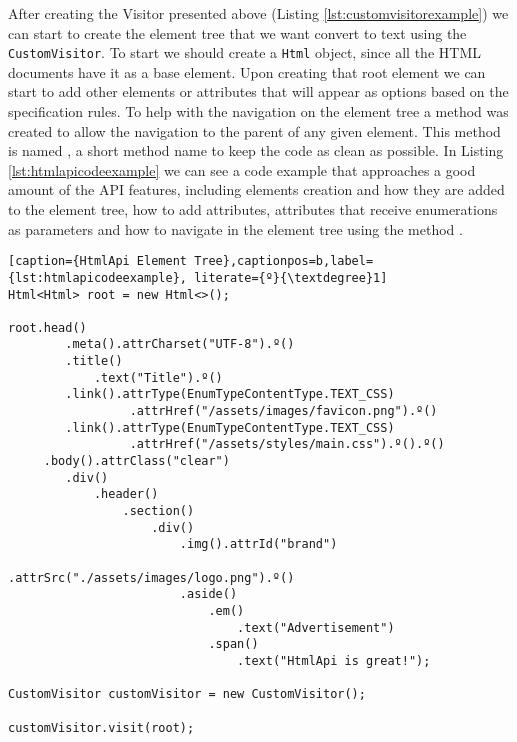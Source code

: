 \noindent
After creating the Visitor presented above (Listing \ref{lst:customvisitorexample}) we can start to create the element tree that we want convert to text using the \texttt{CustomVisitor}. To start we should create a \texttt{Html} object, since all the \ac{HTML} documents have it as a base element. Upon creating that root element we can start to add other elements or attributes that will appear as options based on the specification rules. To help with the navigation on the element tree a method was created to allow the navigation to the parent of any given element. This method is named \texttt{\textdegree}, a short method name to keep the code as clean as possible. In Listing \ref{lst:htmlapicodeexample} we can see a code example that approaches a good amount of the \ac{API} features, including elements creation and how they are added to the element tree, how to add attributes, attributes that receive enumerations as parameters and how to navigate in the element tree using the method \texttt{\textdegree}.

\bigskip


\begin{minipage}{\linewidth}
\begin{lstlisting}[caption={HtmlApi Element Tree},captionpos=b,label={lst:htmlapicodeexample}, literate={º}{\textdegree}1]
Html<Html> root = new Html<>();

root.head()
        .meta().attrCharset("UTF-8").º()
        .title()
            .text("Title").º()
        .link().attrType(EnumTypeContentType.TEXT_CSS)
                 .attrHref("/assets/images/favicon.png").º()
        .link().attrType(EnumTypeContentType.TEXT_CSS)
                 .attrHref("/assets/styles/main.css").º().º()
     .body().attrClass("clear")
        .div()
            .header()
                .section()
                    .div()
                        .img().attrId("brand")
                                .attrSrc("./assets/images/logo.png").º()
                        .aside()
                            .em()
                                .text("Advertisement")
                            .span()
                                .text("HtmlApi is great!");
                                    
CustomVisitor customVisitor = new CustomVisitor();
    
customVisitor.visit(root);
\end{lstlisting}
\end{minipage}

